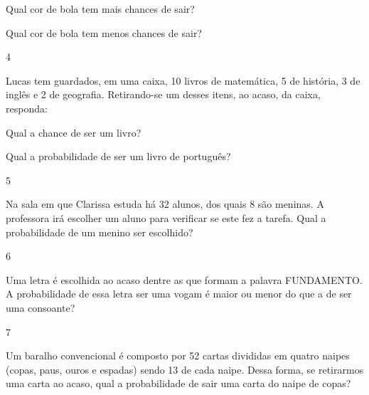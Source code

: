 \begin{multicols}{2}
{\begin{escolha}
\begin{escolha}

\item
Qual cor de bola tem mais chances de sair?

\item
 Qual cor de bola tem menos chances de sair?
\end{escolha}


\num{4}

Lucas tem guardados, em uma caixa, 10 livros de matemática, 5 de história, 3 de inglês e
2 de geografia. Retirando-se um desses itens, ao acaso, da caixa,
responda:

\begin{escolha}

\item
 Qual a chance de ser um livro?

\item
  Qual a probabilidade de ser um livro de português?

\end{escolha}

\num{5}

Na sala em que Clarissa estuda há 32 alunos, dos quais 8 são meninas. A
professora irá escolher um aluno para verificar se este fez a tarefa.
Qual a probabilidade de um menino ser escolhido?


\num{6}

Uma letra é escolhida ao acaso dentre as que formam a palavra
FUNDAMENTO. A probabilidade de essa letra ser uma vogam é maior ou menor do que a de ser uma consoante?


\num{7}

Um baralho convencional é composto por 52 cartas divididas em quatro
naipes (copas, paus, ouros e espadas) sendo 13 de cada naipe. Dessa
forma, se retirarmos uma carta ao acaso, qual a probabilidade de sair
uma carta do naipe de copas?


\end{escolha}}
\end{multicols}

